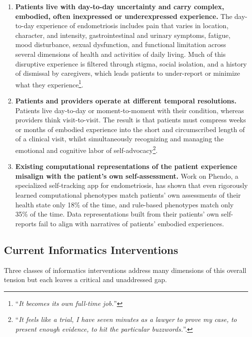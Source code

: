 \begin{enumerate}
  \item \textbf{Patients live with day-to-day uncertainty and carry complex, embodied, often inexpressed or underexpressed experience.} The day-to-day experience of endometriosis includes pain that varies in location, character, and intensity, gastrointestinal and urinary symptoms, fatigue, mood disturbance, sexual dysfunction, and functional limitation across several dimensions of health and activities of daily living\cite{McKillop2019Thesis,Urteaga2020Phenotypes}. Much of this disruptive experience is filtered through stigma, social isolation, and a history of dismissal by caregivers, which leads patients to under-report or minimize what they experience\cite{Ballard2006Endometriosis,Pichon2025Betrayal}\footnote{``\textit{It becomes its own full-time job.}''\cite{Pichon2021Divided}}.

  \item \textbf{Patients and providers operate at different temporal resolutions.} Patients live day-to-day or moment-to-moment with their condition, whereas providers think visit-to-visit. The result is that patients must compress weeks or months of embodied experience into the short and circumscribed length of of a clinical visit, whilst simultaneously recognizing and managing the emotional and cognitive labor of self-advocacy\cite{Pichon2021Divided}\footnote{``\textit{It feels like a trial, I have seven minutes as a lawyer to prove my case, to present enough evidence, to hit the particular buzzwords.}''\cite{Pichon2021Divided}.}.

  \item \textbf{Existing computational representations of the patient experience misalign with the patient's own self-assessment.} Work on Phendo, a specialized self-tracking app for endometriosis, has shown that even rigorously learned computational phenotypes match patients' own assessments of their health state only 18\% of the time, and rule-based phenotypes match only 35\% of the time\cite{Pichon2025Betrayal}. Data representations built from their patients' own self-reports fail to align with narratives of patients' embodied experiences.
\end{enumerate}

\subsection{Current Informatics Interventions}

Three classes of informatics interventions address many dimensions of this overall tension but each leaves a critical and unaddressed gap.

